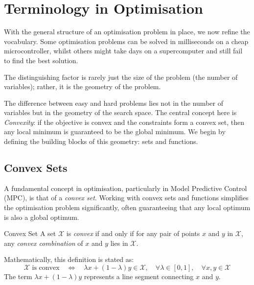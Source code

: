 
\section{Terminology in Optimisation}

With the general structure of an optimisation problem in place, we now refine the vocabulary. Some optimisation problems can be solved in milliseconds on a cheap microcontroller, whilst others might take days on a supercomputer and still fail to find the best solution.

The distinguishing factor is rarely just the size of the problem (the number of variables); rather, it is the geometry of the problem.

The difference between easy and hard problems lies not in the number of variables but in the geometry of the search space. The central concept here is \emph{Convexity}: if the objective is convex and the constraints form a convex set, then any local minimum is guaranteed to be the global minimum. We begin by defining the building blocks of this geometry: sets and functions.

\subsection{Convex Sets}

A fundamental concept in optimisation, particularly in Model Predictive Control (MPC), is that of a \emph{convex set}. Working with convex sets and functions simplifies the optimisation problem significantly, often guaranteeing that any local optimum is also a global optimum.

\begin{defnbox}{Convex Set}
	A set $\mathcal{X}$ is \emph{convex} if and only if for any pair of points $x$ and $y$ in $\mathcal{X}$, any \emph{convex combination} of $x$ and $y$ lies in $\mathcal{X}$.
\end{defnbox}

Mathematically, this definition is stated as:
$$
\mathcal{X} \text{ is convex} \quad \Longleftrightarrow \quad \lambda x + (1 - \lambda)y \in \mathcal{X}, \quad \forall \lambda \in [0, 1], \quad \forall x, y \in \mathcal{X}
$$
The term $\lambda x + (1 - \lambda)y$ represents a line segment connecting $x$ and $y$.

